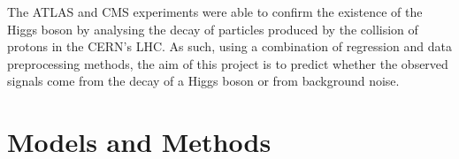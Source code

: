\documentclass[10pt,conference,compsocconf]{IEEEtran}
\begin{document}
The ATLAS and CMS experiments were able to confirm the existence of 
the Higgs boson by analysing the decay of particles produced by 
the collision of protons in the CERN's LHC. 
As such, using a combination of regression and data preprocessing 
methods, the aim of this project is to predict whether the observed 
signals come from the decay of a Higgs boson or from background noise.

\section{Models and Methods}



\end{document}
